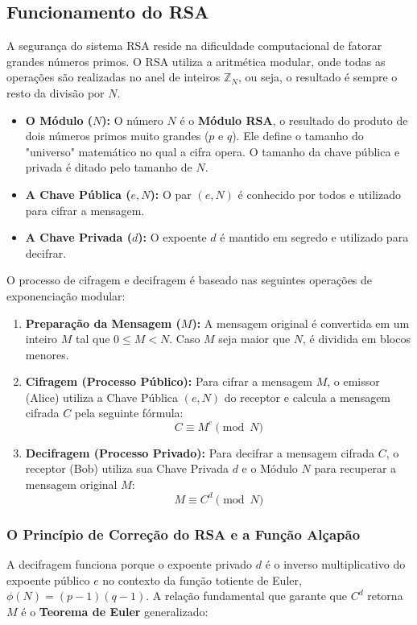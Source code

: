 \documentclass{article}
\theoremstyle{definicao_estilo}
\begin{document}
\subsection{Funcionamento do RSA}
A segurança do sistema RSA reside na dificuldade computacional de fatorar grandes números primos. O RSA utiliza a aritmética modular, onde todas as operações são realizadas no anel de inteiros $\mathbb{Z}_N$, ou seja, o resultado é sempre o resto da divisão por $N$.

\begin{itemize}
\item \textbf{O Módulo ($N$):} O número $N$ é o \textbf{Módulo RSA}, o resultado do produto de dois números primos muito grandes ($p$ e $q$). Ele define o tamanho do "universo" matemático no qual a cifra opera. O tamanho da chave pública e privada é ditado pelo tamanho de $N$.
\item \textbf{A Chave Pública ($e, N$):} O par $(e, N)$ é conhecido por todos e utilizado para cifrar a mensagem.
\item \textbf{A Chave Privada ($d$):} O expoente $d$ é mantido em segredo e utilizado para decifrar.
\end{itemize}

O processo de cifragem e decifragem é baseado nas seguintes operações de exponenciação modular:

\begin{enumerate}
\item \textbf{Preparação da Mensagem ($M$):} A mensagem original é convertida em um inteiro $M$ tal que $0 \le M < N$. Caso $M$ seja maior que $N$, é dividida em blocos menores.
\item \textbf{Cifragem (Processo Público):} Para cifrar a mensagem $M$, o emissor (Alice) utiliza a Chave Pública $(e, N)$ do receptor e calcula a mensagem cifrada $C$ pela seguinte fórmula:
$$ C \equiv M^e \pmod N $$
\item \textbf{Decifragem (Processo Privado):} Para decifrar a mensagem cifrada $C$, o receptor (Bob) utiliza sua Chave Privada $d$ e o Módulo $N$ para recuperar a mensagem original $M$:
$$ M \equiv C^d \pmod N $$
\end{enumerate}

\subsubsection*{O Princípio de Correção do RSA e a Função Alçapão}
A decifragem funciona porque o expoente privado $d$ é o inverso multiplicativo do expoente público $e$ no contexto da função totiente de Euler, $\phi(N) = (p-1)(q-1)$. A relação fundamental que garante que $C^d$ retorna $M$ é o \textbf{Teorema de Euler} generalizado:
\end{document}
